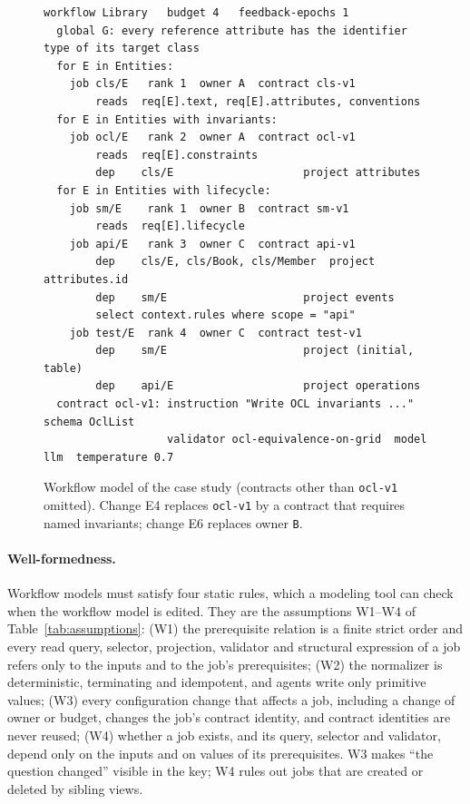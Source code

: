 \documentclass[pdflatex,sn-mathphys-num]{sn-jnl}
\theoremstyle{thmstyleone}%
\theoremstyle{thmstyletwo}%
\theoremstyle{thmstylethree}%
\begin{document}
\begin{figure}[!ht]
\centering
\begin{minipage}{0.97\textwidth}
\footnotesize
\begin{verbatim}
workflow Library   budget 4   feedback-epochs 1
  global G: every reference attribute has the identifier type of its target class
  for E in Entities:
    job cls/E   rank 1  owner A  contract cls-v1
        reads  req[E].text, req[E].attributes, conventions
  for E in Entities with invariants:
    job ocl/E   rank 2  owner A  contract ocl-v1
        reads  req[E].constraints
        dep    cls/E                    project attributes
  for E in Entities with lifecycle:
    job sm/E    rank 1  owner B  contract sm-v1
        reads  req[E].lifecycle
    job api/E   rank 3  owner C  contract api-v1
        dep    cls/E, cls/Book, cls/Member  project attributes.id
        dep    sm/E                     project events
        select context.rules where scope = "api"
    job test/E  rank 4  owner C  contract test-v1
        dep    sm/E                     project (initial, table)
        dep    api/E                    project operations
  contract ocl-v1: instruction "Write OCL invariants ..."  schema OclList
                   validator ocl-equivalence-on-grid  model llm  temperature 0.7
\end{verbatim}
\end{minipage}
\caption{Workflow model of the case study (contracts other than \texttt{ocl-v1} omitted). Change E4 replaces \texttt{ocl-v1} by a contract that requires named invariants; change E6 replaces owner \texttt{B}.}\label{fig:workflow}
\end{figure}

\paragraph{Well-formedness.} Workflow models must satisfy four static rules, which a modeling tool can check when the workflow model is edited. They are the assumptions W1--W4 of Table~\ref{tab:assumptions}: (W1) the prerequisite relation is a finite strict order and every read query, selector, projection, validator and structural expression of a job refers only to the inputs and to the job's prerequisites; (W2) the normalizer is deterministic, terminating and idempotent, and agents write only primitive values; (W3) every configuration change that affects a job, including a change of owner or budget, changes the job's contract identity, and contract identities are never reused; (W4) whether a job exists, and its query, selector and validator, depend only on the inputs and on values of its prerequisites. W3 makes ``the question changed'' visible in the key; W4 rules out jobs that are created or deleted by sibling views.
\end{document}
